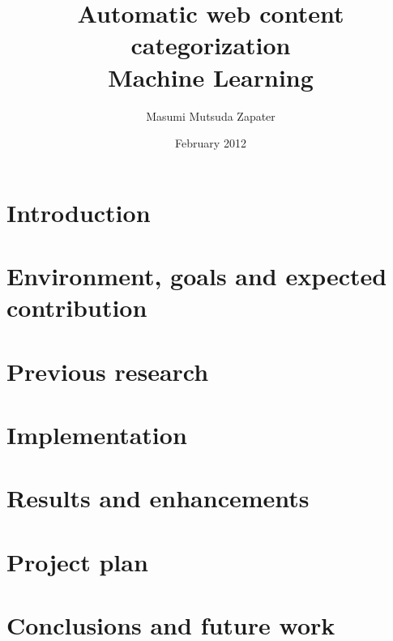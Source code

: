 \documentclass[12pt, a4paper , titlepage]{report}
\author{Masumi Mutsuda Zapater}
\title{Automatic web content categorization \\ Machine Learning}
\date{February 2012}
\begin{document}
\maketitle



\tableofcontents


\chapter{Introduction}


\chapter[Environment and goals]{Environment, goals and expected contribution}
\label{chap:flowsight}


\chapter{Previous research}
\label{chap:research}


\chapter{Implementation}
\label{chap:implementation}


\chapter[Results \& enhancements]{Results and enhancements}
\label{chap:enhancements}


\chapter{Project plan}
\label{chap:plan}



\chapter[Conclusions]{Conclusions and future work}
\label{chap:conclusions}


\cleardoublepage
{}
{}


\cleardoublepage
{}
{} 
\listoffigures
\end{document}
